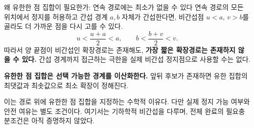 \begin{frame}{왜 유한한 점 집합이 필요한가: 연속 경로에는 최소가 없을 수 있다}
\small
연속 경로의 모든 위치에서 정지를 허용하고 간섭 경계 $a,b$ 자체가 간섭한다면,
비간섭점 $u<a$, $v>b$를 골라도 더 가까운 점을 다시 고를 수 있다.
\begin{equation}
 u<\frac{u+a}{2}<a,\qquad
 b<\frac{b+v}{2}<v.\tag{26}
\end{equation}
따라서 양 끝점이 비간섭인 확장경로는 존재해도,
\textbf{가장 짧은 확장경로는 존재하지 않을 수 있다.}
간섭 경계까지 접근하는 극한을 실제 비간섭 정지점으로 사용할 수는 없다.
\begin{center}\end{center}
\textbf{유한한 점 집합은 선택 가능한 경계를 이산화한다.}
앞뒤 후보가 존재하면 유한 집합의 최댓값과 최솟값으로 최소 확장이 정해진다.
\par\medskip\footnotesize
이는 경로 위에 유한한 점 집합을 지정하는 수학적 이유다. 다만 실제 정지 가능 여부와 안전 여유는
별도 조건이다. 여기서는 기하학적 비간섭을 다루며, 전체 완료의 필요충분조건은
아직 증명하지 않았다.
\end{frame}

